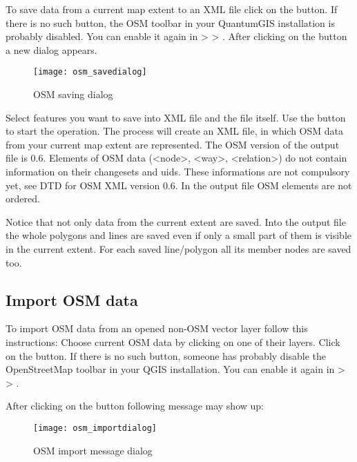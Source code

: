 To save data from a current map extent to an XML file click on the
 button. If there is no such button, 
the OSM toolbar in your QuantumGIS installation is probably disabled. You can 
enable it again in  >  >
. After clicking on the button a new dialog appears.

\begin{figure}[ht]
   \begin{center}
   \caption{OSM saving dialog \nixcaption}\label{fig:osmsave}\smallskip
   \texttt{[image: osm\_savedialog]}
\end{center}
\end{figure}

Select features you want to save into XML file and the file itself. Use 
the  button to start the operation. The process will create an 
XML file, in which OSM data from your current map extent are represented. 
The OSM version of the output file is 0.6. Elements of OSM data 
(<node>, <way>, <relation>) do not contain information on their changesets 
and uids. These informations are not compulsory yet, see DTD for
OSM XML version 0.6. In the output file OSM elements are not ordered.

Notice that not only data from the current extent are saved. Into the output 
file the whole polygons and lines are saved even if only a small part of them 
is visible in the current extent. For each saved line/polygon all its member 
nodes are saved too.

\subsection{Import OSM data}  

To import OSM data from an opened non-OSM vector layer follow this 
instructions: Choose current OSM data by clicking on one of their layers. 
Click on the  button. If 
there is no such button, someone has probably disable the OpenStreetMap 
toolbar in your QGIS installation. You can enable it again in 
 >  > . 

After clicking on the button following message may show up:

\begin{figure}[ht]
   \begin{center}
   \caption{OSM import message dialog \nixcaption}\label{fig:osmimportmessage}\smallskip
   \texttt{[image: osm\_importdialog]}
\end{center}
\end{figure}

